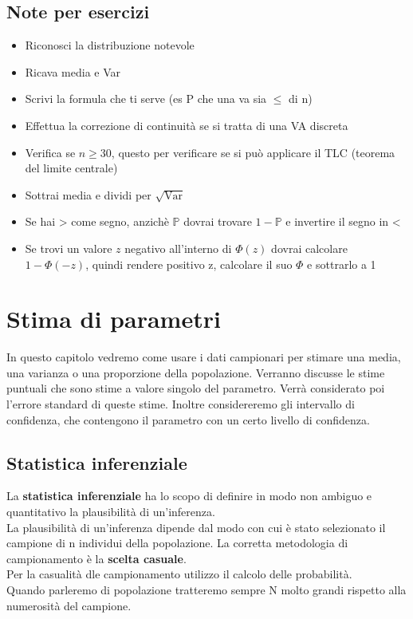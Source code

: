 \documentclass[12pt, a4paper, openany]{book}
\begin{document}
\section*{Note per esercizi}
\begin{itemize}
    \item Riconosci la distribuzione notevole
    \item Ricava media e Var
    \item Scrivi la formula che ti serve (es P che una va sia $\leq$ di n)
    \item Effettua la correzione di continuità se si tratta di una VA discreta
    \item Verifica se $n\geq 30$, questo per verificare se si può applicare il TLC (teorema del limite centrale)
    \item Sottrai media e dividi per $\sqrt{\text{Var}}$
    \item Se hai > come segno, anzichè $\mathbb{P}$ dovrai trovare $1-\mathbb{P}$ e invertire il segno in <
    \item Se trovi un valore $z$ negativo all'interno di $\Phi(z)$ dovrai calcolare $1 - \Phi(-z)$, quindi rendere positivo
    z, calcolare il suo $\Phi$ e sottrarlo a 1
\end{itemize}

\chapter{Stima di parametri}
In questo capitolo vedremo come usare i dati campionari per stimare una media,
una varianza o una proporzione della popolazione. Verranno discusse le stime puntuali
che sono stime a valore singolo del parametro. Verrà considerato poi l'errore standard di
queste stime. Inoltre considereremo gli intervallo di confidenza, che contengono il parametro
con un certo livello di confidenza.
\section{Statistica inferenziale}
La \textbf{statistica inferenziale} ha lo scopo di definire in modo non ambiguo e
quantitativo la plausibilità di un'inferenza.
\\ La plausibilità di un'inferenza dipende dal modo con cui è stato selezionato
il campione di n individui della popolazione.
La corretta metodologia di campionamento è la \textbf{scelta casuale}.
\\ Per la casualità dle campionamento utilizzo il calcolo delle probabilità.
\\ Quando parleremo di popolazione tratteremo sempre N molto grandi rispetto alla numerosità
del campione. 
\end{document}

